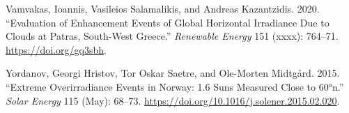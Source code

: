 \documentclass[
]{article}
\newlength{\cslhangindent}
\newlength{\cslentryspacingunit} %
\newenvironment{CSLReferences}[2] %
 {%
  \setlength{\parindent}{0pt}
  \ifodd #1
  \let\oldpar\par
  \def\par{\hangindent=\cslhangindent\oldpar}
  \fi
  \setlength{\parskip}{#2\cslentryspacingunit}
 }%
 {}
\begin{document}
\begin{CSLReferences}{1}{0}
\leavevmode{}%
Vamvakas, Ioannis, Vasileios Salamalikis, and Andreas Kazantzidis. 2020. {``Evaluation of Enhancement Events of Global Horizontal Irradiance Due to Clouds at Patras, South-West Greece.''} \emph{Renewable Energy} 151 (xxxx): 764--71. \url{https://doi.org/gq3sbh}.

\leavevmode{}%
Yordanov, Georgi Hristov, Tor Oskar Saetre, and Ole-Morten Midtgård. 2015. {``Extreme Overirradiance Events in Norway: 1.6 Suns Measured Close to 60°n.''} \emph{Solar Energy} 115 (May): 68--73. \url{https://doi.org/10.1016/j.solener.2015.02.020}.

\end{CSLReferences}
\end{document}
